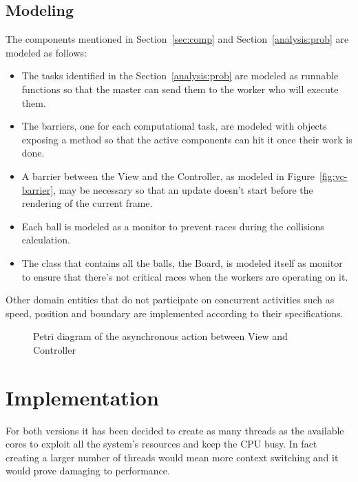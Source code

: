 \documentclass{scrartcl}
\begin{document}
\subsection{Modeling}\label{sec:modeling}
The components mentioned in Section~\ref{sec:comp} and Section~\ref{analysis:prob} are modeled as follows:
\begin{itemize}
    \item The tasks identified in the Section~\ref{analysis:prob} are modeled as runnable functions
        so that the master can send them to the worker who will execute them.

    \item The barriers, one for each computational task, are modeled with objects exposing a
    method so that the active components can hit it once their work is done. %
    
    \item A barrier between the View and the Controller, as modeled in Figure~\ref{fig:vc-barrier},
    may be necessary so that an update doesn't start before the rendering of the current frame.

    \item Each ball is modeled as a monitor to prevent races during the collisions calculation.

    \item The class that contains all the balls, the Board, is modeled itself as monitor to ensure
    that there's not critical races when the workers are operating on it.
\end{itemize}
Other domain entities that do not participate on concurrent activities
such as speed, position and boundary are implemented according to their
specifications.

\begin{figure}[H]
    \centering
    \makebox[\textwidth][c]{
        
    }
    \caption{Petri diagram of the asynchronous action between View and Controller}\label{fig:vc-petri}
\end{figure}


\section{Implementation}
For both versions it has been decided to create as many threads as the available 
cores to exploit all the system's resources and keep the CPU busy.
In fact creating a larger number of threads would mean more context switching
and it would prove damaging to performance.
\end{document}
